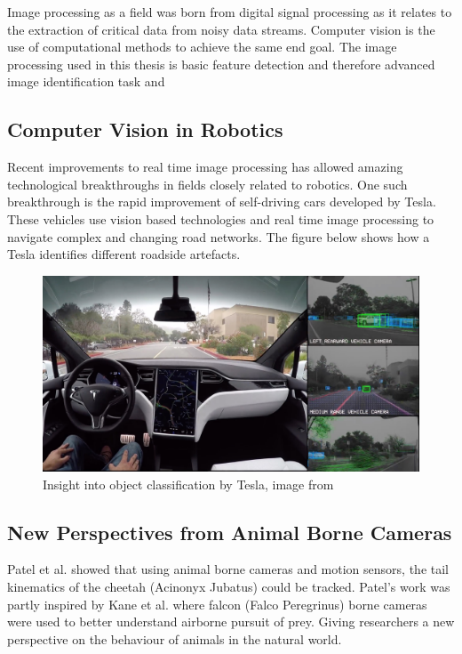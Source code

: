 Image processing as a field was born from digital signal processing as it relates to the extraction of critical data from noisy data streams. Computer vision is the use of computational methods to achieve the same end goal. The image processing used in this thesis is basic feature detection and therefore advanced image identification task and   

\subsection{Computer Vision in Robotics}
Recent improvements to real time image processing has allowed amazing technological breakthroughs in fields closely related to robotics. One such breakthrough is the rapid improvement of self-driving cars developed by Tesla. These vehicles use vision based technologies and real time image processing to navigate complex and changing road networks. The figure below shows how a Tesla identifies different roadside artefacts.

\begin{figure}[!ht] 
\captionsetup{width=0.8\linewidth, font=small}  
\includegraphics[width=0.8\linewidth]{figures/teslaauto.jpg}
\caption{Insight into object classification by Tesla, image from 	\cite{tesla}}
\label{fig:teslaauto}
\end{figure}

\subsection{New Perspectives from Animal Borne Cameras}
Patel et al. \cite{patel2017trackingieee} showed that using animal borne cameras and motion sensors, the tail kinematics of the cheetah (Acinonyx Jubatus) could be tracked. Patel's work was partly inspired by Kane et al. \cite{kane2014falcons} where falcon (Falco Peregrinus) borne cameras were used to better understand airborne pursuit of prey. Giving researchers a new perspective on the behaviour of animals in the natural world.

